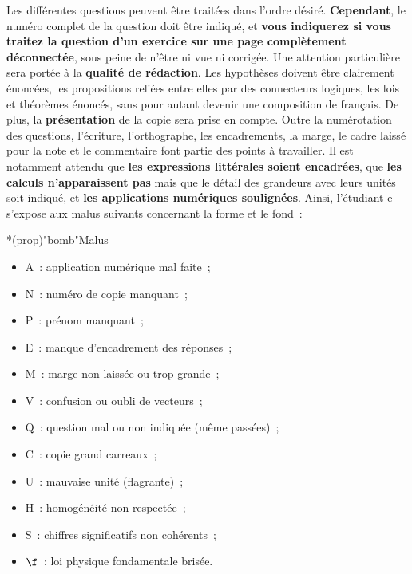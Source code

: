 \documentclass[a4paper, 11pt, garamond, oneside]{book}
\begin{document}
{Les différentes questions peuvent être traitées dans l'ordre désiré.
\textbf{Cependant}, le numéro complet de la question doit être indiqué, et
\textbf{vous indiquerez si vous traitez la question d'un exercice sur une page
	complètement déconnectée}, sous peine de n'être ni vue ni corrigée.
\bigbreak
Une attention particulière sera portée à la \textbf{qualité de rédaction}. Les
hypothèses doivent être clairement énoncées, les propositions reliées entre
elles par des connecteurs logiques, les lois et théorèmes énoncés, sans pour
autant devenir une composition de français.
\bigbreak
De plus, la \textbf{présentation} de la copie sera prise en compte. Outre la
numérotation des questions, l'écriture, l'orthographe, les encadrements, la
marge, le cadre laissé pour la note et le commentaire font partie des points à
travailler. Il est notamment attendu que \textbf{les expressions littérales
	soient encadrées}, que \textbf{les calculs n'apparaissent pas} mais que le
détail des grandeurs avec leurs unités soit indiqué, et \textbf{les applications
	numériques soulignées}.
\bigbreak
Ainsi, l'étudiant-e s'expose aux malus suivants concernant la forme et le fond~:
\begin{tcb}*(prop)"bomb"{Malus}
	\begin{minipage}{0.50\linewidth}
		\begin{itemize}
			\item A~: application numérique mal faite~;
			\item N~: numéro de copie manquant~;
			\item P~: prénom manquant~;
			\item E~: manque d'encadrement des réponses~;
			\item M~: marge non laissée ou trop grande~;
			\item V~: confusion ou oubli de vecteurs~;
		\end{itemize}
	\end{minipage}
	\begin{minipage}{0.50\linewidth}
		\begin{itemize}
			\item Q~: question mal ou non indiquée (même passées)~;
			\item C~: copie grand carreaux~;
			\item U~: mauvaise unité (flagrante)~;
			\item H~: homogénéité non respectée~;
			\item S~: chiffres significatifs non cohérents~;
			\item $\f$~: loi physique fondamentale brisée.
		\end{itemize}
	\end{minipage}
\end{tcb}

}
\end{document}
